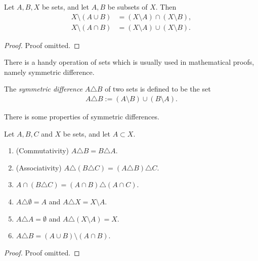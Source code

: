\begin{proposition}
    Let $A, B, X$ be sets, and let $A, B$ be subsets of $X$. Then
    \begin{align*}
        X \setminus (A \cup B) &= (X \setminus A) \cap (X \setminus B),\\
        X \setminus (A \cap B) &= (X \setminus A) \cup (X \setminus B).
    \end{align*}
\end{proposition}

\begin{proof}
    Proof omitted.
\end{proof}

There is a handy operation of sets which is usually used in mathematical proofs, namely symmetric difference.

\begin{definition}
    The \emph{symmetric difference} $A \triangle B$ of two sets is defined to be the set
    \begin{align*}
        A \triangle B := (A \setminus B) \cup (B \setminus A).
    \end{align*}
\end{definition}

There is some properties of symmetric differences.

\begin{proposition}
    Let $A, B, C$ and $X$ be sets, and let $A \subset X$.
    \begin{enumerate}
        \item (Commutativity) $A \triangle B = B \triangle A$.
        \item (Associativity) $A \triangle (B \triangle C) = (A \triangle B) \triangle C$.
        \item $A \cap (B \triangle C) = (A \cap B) \triangle (A \cap C)$.
        \item $A \triangle \emptyset = A$ and $A \triangle X = X \setminus A$.
        \item $A \triangle A = \emptyset$ and $A \triangle (X \setminus A) = X$.
        \item $A \triangle B = (A \cup B) \setminus (A \cap B)$.
    \end{enumerate}
\end{proposition}

\begin{proof}
    Proof omitted.
\end{proof}

